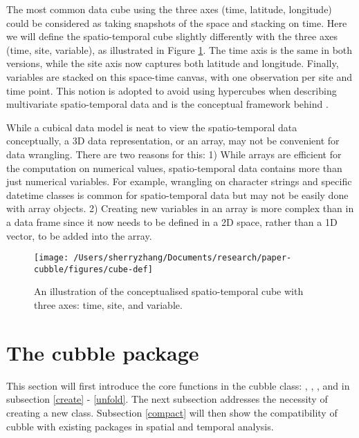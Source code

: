 \documentclass{article}
\begin{document}
The most common data cube using the three axes (time, latitude, longitude) could be considered as taking snapshots of the space and stacking on time. Here we will define the spatio-temporal cube slightly differently with the three axes (time, site, variable), as illustrated in Figure \ref{fig:cube-def}. The time axis is the same in both versions, while the site axis now captures both latitude and longitude. Finally, variables are stacked on this space-time canvas, with one observation per site and time point. This notion is adopted to avoid using hypercubes when describing multivariate spatio-temporal data and is the conceptual framework behind .

While a cubical data model is neat to view the spatio-temporal data conceptually, a 3D data representation, or an array, may not be convenient for data wrangling. There are two reasons for this: 1) While arrays are efficient for the computation on numerical values, spatio-temporal data contains more than just numerical variables. For example, wrangling on character strings and specific datetime classes is common for spatio-temporal data but may not be easily done with array objects. 2) Creating new variables in an array is more complex than in a data frame since it now needs to be defined in a 2D space, rather than a 1D vector, to be added into the array.

\begin{figure}

{\centering \texttt{[image: /Users/sherryzhang/Documents/research/paper-cubble/figures/cube-def]} 

}

\caption{An illustration of the conceptualised spatio-temporal cube with three axes: time, site, and variable.}\label{fig:cube-def}
\end{figure}

\hypertarget{cubble}{%
\section{The cubble package}\label{cubble}}

This section will first introduce the core functions in the cubble class: , , , and  in subsection \ref{create} - \ref{unfold}. The next subsection addresses the necessity of creating a new class. Subsection \ref{compact} will then show the compatibility of cubble with existing packages in spatial and temporal analysis.
\end{document}
